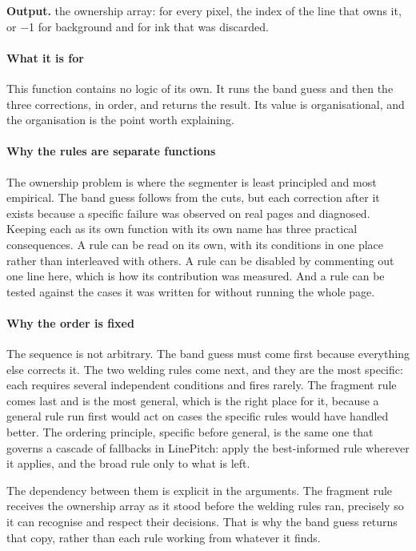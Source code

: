 \noindent\textbf{Output.} the ownership array: for every pixel, the index of the line that owns it, or $-$1 for background and for ink that was discarded.


\paragraph{What it is for}
This function contains no logic of its own. It runs the band guess and then the three corrections, in order, and returns the result. Its value is organisational, and the organisation is the point worth explaining.


\paragraph{Why the rules are separate functions}
The ownership problem is where the segmenter is least principled and most empirical. The band guess follows from the cuts, but each correction after it exists because a specific failure was observed on real pages and diagnosed. Keeping each as its own function with its own name has three practical consequences. A rule can be read on its own, with its conditions in one place rather than interleaved with others. A rule can be disabled by commenting out one line here, which is how its contribution was measured. And a rule can be tested against the cases it was written for without running the whole page.


\paragraph{Why the order is fixed}
The sequence is not arbitrary. The band guess must come first because everything else corrects it. The two welding rules come next, and they are the most specific: each requires several independent conditions and fires rarely. The fragment rule comes last and is the most general, which is the right place for it, because a general rule run first would act on cases the specific rules would have handled better. The ordering principle, specific before general, is the same one that governs a cascade of fallbacks in LinePitch: apply the best-informed rule wherever it applies, and the broad rule only to what is left.

The dependency between them is explicit in the arguments. The fragment rule receives the ownership array as it stood before the welding rules ran, precisely so it can recognise and respect their decisions. That is why the band guess returns that copy, rather than each rule working from whatever it finds.


